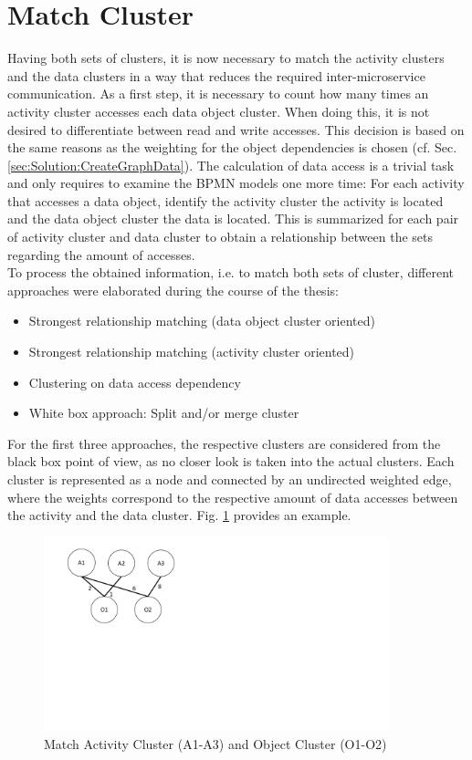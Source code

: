 \section{Match Cluster}
\label{sec:Solution:MatchCluster}
Having both sets of clusters, it is now necessary to match the activity clusters and the data clusters in a way that reduces the required inter-microservice communication. As a first step, it is necessary to count how many times an activity cluster accesses each data object cluster. When doing this, it is not desired to differentiate between read and write accesses. This decision is based on the same reasons as the weighting for the object dependencies is chosen (cf. Sec. \ref{sec:Solution:CreateGraphData}). The calculation of data access is a trivial task and only requires to examine the BPMN models one more time: For each activity that accesses a data object, identify the activity cluster the activity is located and the data object cluster the data is located. This is summarized for each pair of activity cluster and data cluster to obtain a relationship between the sets regarding the amount of accesses.\\
To process the obtained information, i.e. to match both sets of cluster, different approaches were elaborated during the course of the thesis:

\begin{itemize}
	\item Strongest relationship matching (data object cluster oriented)
	\item Strongest relationship matching (activity cluster oriented)
	\item Clustering on data access dependency
	\item White box approach: Split and/or merge cluster
\end{itemize}

\noindent
For the first three approaches, the respective clusters are considered from the black box point of view, as no closer look is taken into the actual clusters. Each cluster is represented as a node and connected by an undirected weighted edge, where the weights correspond to the respective amount of data accesses between the activity and the data cluster. Fig. \ref{fig:matchCluster} provides an example.\\

\begin{figure}[h!]
	\centering
	\includegraphics[width=10cm, trim={1.5cm 9.5cm 16.0cm 0cm}]{img/MatchCluster.pdf}
	\caption{Match Activity Cluster (A1-A3) and Object Cluster (O1-O2)}
	\label{fig:matchCluster}
\end{figure}

